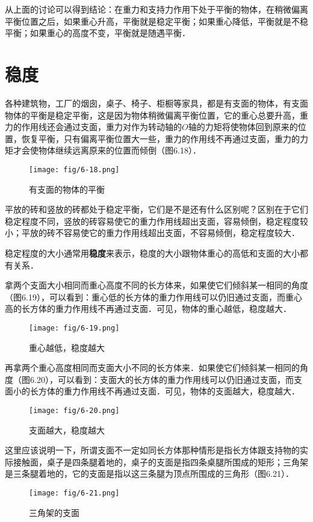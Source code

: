 从上面的讨论可以得到结论：在重力和支持力作用下处于平衡的物体，在稍微偏离平衡位置之后，如果重心升高，平衡就是稳定平衡；如果重心降低，平衡就是不稳平衡；如果重心的高度不变，平衡就是随遇平衡．


\section{稳度}
各种建筑物，工厂的烟囱，桌子、椅子、柜橱等家具，都是有支面的物体，有支面物体的平衡是稳定平衡，这是因为物体稍微偏离平衡位置，它的重心总要升高，重力的作用线还会通过支面，重力对作为转动轴的$O$轴的力矩将使物体回到原来的位置，恢复平衡，只有偏离平衡位置大一些，重力的作用线不再通过支面，重力的力矩才会使物体继续远离原来的位置而倾倒（图6.18）．
\begin{figure}[htp]
\centering\texttt{[image: fig/6-18.png]}
\caption{有支面的物体的平衡}
\end{figure}

平放的砖和竖放的砖都处于稳定平衡，它们是不是还有什么区别呢？区别在于它们稳定程度不同，竖放的砖容易使它的重力作用线超出支面，容易倾倒，稳定程度较小；平放的砖不容易使它的重力作用线超出支面，不容易倾倒，稳定程度较大．

稳定程度的大小通常用\textbf{稳度}来表示，稳度的大小跟物体重心的高低和支面的大小都有关系．

拿两个支面大小相同而重心高度不同的长方体来，如果使它们倾斜某一相同的角度（图6.19），可以看到：重心低的长方体的重力作用线可以仍旧通过支面，而重心高的长方体的重力作用线不再通过支面．可见，物体的重心越低，稳度越大．
\begin{figure}[htp]
\centering\texttt{[image: fig/6-19.png]}
\caption{重心越低，稳度越大}
\end{figure}

再拿两个重心高度相同而支面大小不同的长方体来．如果使它们倾斜某一相同的角度（图6.20），可以看到：支面大的长方体的重力作用线可以仍旧通过支面，而支面小的长方体的重力作用线不再通过支面．可见，物体的支面越大，稳度越大．
\begin{figure}[htp]
\centering\texttt{[image: fig/6-20.png]}
\caption{支面越大，稳度越大}
\end{figure}

这里应该说明一下，所谓支面不一定如同长方体那种情形是指长方体跟支持物的实际接触面，桌子是四条腿着地的，桌子的支面是指四条桌腿所围成的矩形；三角架是三条腿着地的，它的支面是指以这三条腿为顶点所围成的三角形（图6.21）．
\begin{figure}[htp]
\centering\texttt{[image: fig/6-21.png]}
\caption{三角架的支面}
\end{figure}

